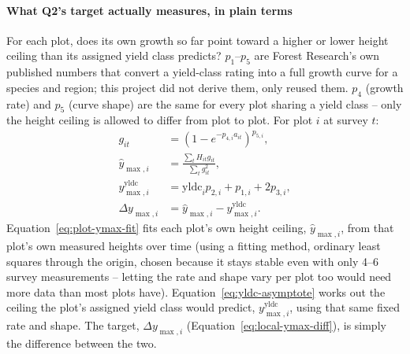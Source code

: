 \documentclass[logo,msc,ai]{infthesis}           %
\begin{document}
\paragraph*{What Q2's target actually measures, in plain terms} For each plot, does its own growth so far point toward a higher or lower height ceiling than its assigned yield class predicts? $p_1$--$p_5$ are Forest Research's own published numbers that convert a yield-class rating into a full growth curve for a species and region; this project did not derive them, only reused them. $p_4$ (growth rate) and $p_5$ (curve shape) are the same for every plot sharing a yield class -- only the height ceiling is allowed to differ from plot to plot. For plot $i$ at survey $t$:
\begin{align}
g_{it} &= \left(1-e^{-p_{4,i}a_{it}}\right)^{p_{5,i}}, \label{eq:git-curve} \\
\hat y_{\max,i} &= \frac{\sum_t H_{it}g_{it}}{\sum_t g_{it}^2}, \label{eq:plot-ymax-fit} \\
y_{\max,i}^{\mathrm{yldc}} &= \mathrm{yldc}_i p_{2,i}+p_{1,i}+2p_{3,i}, \label{eq:yldc-asymptote} \\
\Delta y_{\max,i} &= \hat y_{\max,i}-y_{\max,i}^{\mathrm{yldc}}. \label{eq:local-ymax-diff}
\end{align}
Equation~\eqref{eq:plot-ymax-fit} fits each plot's own height ceiling, $\hat y_{\max,i}$, from that plot's own measured heights over time (using a fitting method, ordinary least squares through the origin, chosen because it stays stable even with only 4--6 survey measurements -- letting the rate and shape vary per plot too would need more data than most plots have). Equation~\eqref{eq:yldc-asymptote} works out the ceiling the plot's assigned yield class would predict, $y_{\max,i}^{\mathrm{yldc}}$, using that same fixed rate and shape. The target, $\Delta y_{\max,i}$ (Equation~\eqref{eq:local-ymax-diff}), is simply the difference between the two.
\end{document}
